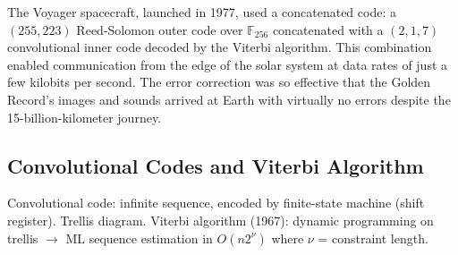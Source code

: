 The Voyager spacecraft, launched in 1977, used a concatenated code: a $(255, 223)$ Reed-Solomon outer code over $\mathbb{F}_{256}$ concatenated with a $(2,1,7)$ convolutional inner code decoded by the Viterbi algorithm. This combination enabled communication from the edge of the solar system at data rates of just a few kilobits per second. The error correction was so effective that the Golden Record's images and sounds arrived at Earth with virtually no errors despite the 15-billion-kilometer journey.

\subsection{Convolutional Codes and Viterbi Algorithm}
\label{sec:ec:conv}

Convolutional code: infinite sequence, encoded by finite-state machine (shift register). Trellis diagram. Viterbi algorithm (1967): dynamic programming on trellis $\to$ ML sequence estimation in $O(n 2^\nu)$ where $\nu$ = constraint length.

